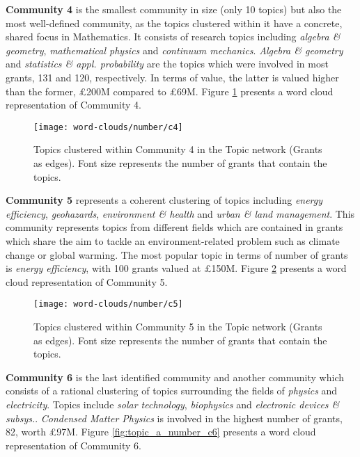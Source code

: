 {\noindent\textbf{Community 4} is the smallest community in size (only 10 topics) but also the most well-defined community, as the topics clustered within it have a concrete, shared focus in Mathematics. It consists of research topics including \textit{algebra \& geometry}, \textit{mathematical physics} and \textit{continuum mechanics}. \textit{Algebra \& geometry} and \textit{statistics \& appl. probability} are the topics which were involved in most grants, 131 and 120, respectively. In terms of value, the latter is valued higher than the former, \pounds200M compared to \pounds69M. Figure \ref{fig:topic_a_number_c4} presents a word cloud representation of Community 4.

\begin{figure}[!htbp]
    \centering
    \texttt{[image: word-clouds/number/c4]}
    \caption[Topics clustered within Community 4 in the Topic network (Grants as edges)]{Topics clustered within Community 4 in the Topic network (Grants as edges). Font size represents the number of grants that contain the topics.}
    \label{fig:topic_a_number_c4}
\end{figure}

\noindent\textbf{Community 5} represents a coherent clustering of topics including \textit{energy efficiency}, \textit{geohazards}, \textit{environment \& health} and \textit{urban \& land management}. This community represents topics from different fields which are contained in grants which share the aim to tackle an environment-related problem such as climate change or global warming. The most popular topic in terms of number of grants is \textit{energy efficiency}, with 100 grants valued at \pounds150M. Figure \ref{fig:topic_a_number_c5} presents a word cloud representation of Community 5.

\begin{figure}[!htbp]
    \centering
    \texttt{[image: word-clouds/number/c5]}
    \caption[Topics clustered within Community 5 in the Topic network (Grants as edges)]{Topics clustered within Community 5 in the Topic network (Grants as edges). Font size represents the number of grants that contain the topics.}
    \label{fig:topic_a_number_c5}
\end{figure}

\noindent\textbf{Community 6} is the last identified community and another community which consists of a rational clustering of topics surrounding the fields of \textit{physics} and \textit{electricity}. Topics include \textit{solar technology}, \textit{biophysics} and \textit{electronic devices \& subsys.}. \textit{Condensed Matter Physics} is involved in the highest number of grants, 82, worth \pounds97M. Figure \ref{fig:topic_a_number_c6} presents a word cloud representation of Community 6.

}
